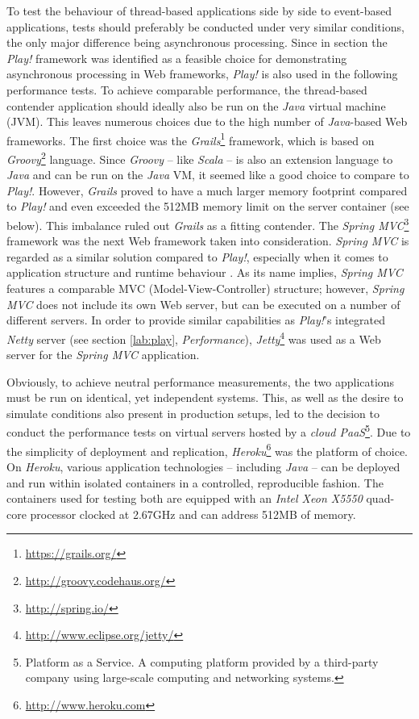 To test the behaviour of thread-based applications side by side to event-based applications, tests should preferably be conducted under very similar conditions, the only major difference being asynchronous processing. Since in section \label{lab:lang} the \textit{Play!} framework was identified  as a feasible choice for demonstrating asynchronous processing in Web frameworks, \textit{Play!} is also used in the following performance tests. To achieve comparable performance, the thread-based contender application should ideally also be run on the \textit{Java} virtual machine (JVM). This leaves numerous choices due to the high number of \textit{Java}-based Web frameworks. The first choice was the \textit{Grails}\footnote{\url{https://grails.org/}} framework, which is based on \textit{Groovy}\footnote{\url{http://groovy.codehaus.org/}} language. Since \textit{Groovy} -- like \textit{Scala} -- is also an extension language to \textit{Java} and can be run on the \textit{Java} VM, it seemed like a good choice to compare to \textit{Play!}. However, \textit{Grails} proved to have a much larger memory footprint compared to \textit{Play!} and even exceeded the 512MB memory limit on the server container (see below). This imbalance ruled out \textit{Grails} as a fitting contender. The \textit{Spring MVC}\footnote{\url{http://spring.io/}} framework was the next Web framework taken into consideration. \textit{Spring MVC} is regarded as a similar solution compared to \textit{Play!}, especially when it comes to application structure and runtime behaviour \cite[p. 109]{Scala}. As its name implies, \textit{Spring MVC} features a comparable MVC (Model-View-Controller) structure; however, \textit{Spring MVC} does not include its own Web server, but can be executed on a number of different servers. In order to provide similar capabilities as \textit{Play!}'s integrated \textit{Netty} server (see section \ref{lab:play}, \textit{Performance}), \textit{Jetty}\footnote{\url{http://www.eclipse.org/jetty/}} was used as a Web server for the \textit{Spring MVC} application.

Obviously, to achieve neutral performance measurements, the two applications must be run on identical, yet independent systems. This, as well as the desire to simulate conditions also present in production setups, led to the decision to conduct the performance tests on virtual servers hosted by a \textit{cloud PaaS}\footnote{Platform as a Service. A computing platform provided by a third-party company using large-scale computing and networking systems.}. Due to the simplicity of deployment and replication, \textit{Heroku}\footnote{\url{http://www.heroku.com}} was the platform of choice. On \textit{Heroku}, various application technologies -- including \textit{Java} -- can be deployed and run within isolated containers in a controlled, reproducible fashion. The containers used for testing both are equipped with an \textit{Intel Xeon X5550} quad-core processor clocked at 2.67GHz and can address 512MB of memory.

